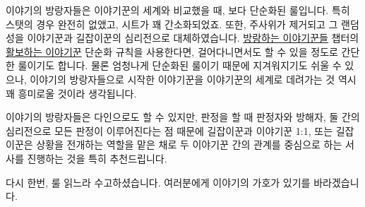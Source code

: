\documentclass{report}
\begin{document}
	이야기의 방랑자들은 이야기꾼의 세계와 비교했을 때, 보다 단순화된 룰입니다. 특히 스탯의 경우 완전히 없앴고, 시트가 꽤 간소화되었죠. 또한, 주사위가 제거되고 그 랜덤성을 이야기꾼과 길잡이꾼의 심리전으로 대체하였습니다. \hyperlink{wandering-storytellers}{방랑하는 이야기꾼들} 챕터의 \hyperlink{walking-storytellers}{활보하는 이야기꾼} 단순화 규칙을 사용한다면, 걸어다니면서도 할 수 있을 정도로 간단한 룰이기도 합니다. 물론 엄청나게 단순화된 룰이기 때문에 지겨워지기도 쉬울 수 있으나, 이야기의 방랑자들으로 시작한 이야기꾼을 이야기꾼의 세계로 데려가는 것 역시 꽤 흥미로울 것이라 생각됩니다.
	
	이야기의 방랑자들은 다인으로도 할 수 있지만, 판정을 할 때 판정자와 방해자, 둘 간의 심리전으로 모든 판정이 이루어진다는 점 때문에 길잡이꾼과 이야기꾼 1:1, 또는 길잡이꾼은 상황을 전개하는 역할을 맡은 채로 두 이야기꾼 간의 관계를 중심으로 하는 서사를 진행하는 것을 특히 추천드립니다.
	
	다시 한번, 룰 읽느라 수고하셨습니다. 여러분에게 이야기의 가호가 있기를 바라겠습니다.
\end{document}
